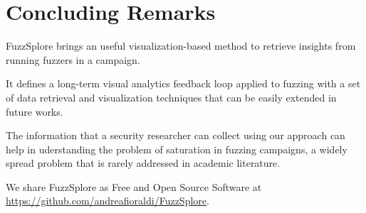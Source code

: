 \documentclass[conference,compsoc]{IEEEtran}
\begin{document}
\section{Concluding Remarks}

{\sc FuzzSplore} brings an useful visualization-based method to retrieve insights from running fuzzers in a campaign. 

It defines a long-term visual analytics feedback loop applied to fuzzing with a set of data retrieval and visualization techniques that can be easily extended in future works. 

The information that a security researcher can collect using our approach can help in uderstanding the problem of saturation in fuzzing campaigns, a widely spread problem that is rarely addressed in academic literature.

We share {\sc FuzzSplore} as Free and Open Source Software at \url{https://github.com/andreafioraldi/FuzzSplore}.



\end{document}
